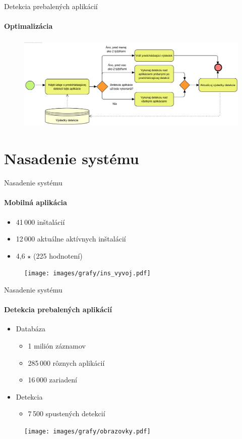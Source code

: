 \documentclass{beamer}
\begin{document}
   \begin{frame}[label=lists]{Detekcia prebalených aplikácií}
 	 \framesubtitle{Optimalizácia}
		\begin{figure}[htb]
	  	\begin{center}
    		\includegraphics[height=4.5cm]{images/detection-optimalization.png}
  		\end{center}
	\end{figure}
  \end{frame}      
  
  \section{Nasadenie systému}  
  \begin{frame}[label=lists]{Nasadenie systému}
   	 \framesubtitle{Mobilná aplikácia}
  	\begin{itemize}
  		\item 41\,000 inštalácií
  		\item 12\,000 aktuálne aktívnych inštalácií
  		\item 4,6 $\star$ (225 hodnotení)
  	\end{itemize}
	\begin{figure}[htb]
	  	\begin{center}
    		\texttt{[image: images/grafy/ins\_vyvoj.pdf]}
  		\end{center}
	\end{figure}
  \end{frame}   
  
    \begin{frame}[label=lists]{Nasadenie systému}
   	 \framesubtitle{Detekcia prebalených aplikácií}

	\begin{itemize}
	\item Databáza
  		\begin{itemize}
	  		\item 1 milión záznamov
  			\item 285\,000  rôznych aplikácií
 			\item 16\,000 zariadení
	   	\end{itemize}
  	 \item Detekcia
  		 \begin{itemize}
  	   		\item 7\,500 spustených detekcií
	  	 \end{itemize}
  	 \end{itemize}
	\begin{figure}[htb]
	  	\begin{center}
    		\texttt{[image: images/grafy/obrazovky.pdf]}
  		\end{center}
	\end{figure}
  \end{frame} 
    
\end{document}

